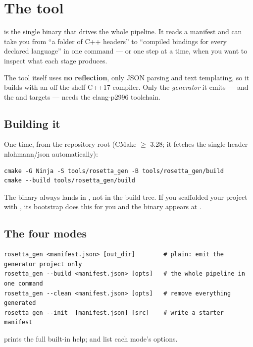 \chapter{The  tool}
\label{ch:rosettagen}

 is the single binary that drives the whole pipeline. It
reads a manifest and can take you from ``a folder of C++ headers'' to ``compiled
bindings for every declared language'' in one command --- or one step at a time,
when you want to inspect what each stage produces.

The tool itself uses \textbf{no reflection}, only JSON parsing and text
templating, so it builds with an off-the-shelf C++17 compiler. Only the
\emph{generator} it emits --- and the  and  targets ---
needs the clang-p2996 toolchain.

\section{Building it}

One-time, from the repository root (CMake $\geq$ 3.28; it fetches the
single-header nlohmann/json automatically):

\begin{lstlisting}[style=sh]
cmake -G Ninja -S tools/rosetta_gen -B tools/rosetta_gen/build
cmake --build tools/rosetta_gen/build
\end{lstlisting}

The binary always lands in \textbf{}, not in the
build tree. If you scaffolded your project with ,
its bootstrap  does this for you and the binary appears at
.

\section{The four modes}

\begin{lstlisting}[style=plain]
rosetta_gen <manifest.json> [out_dir]        # plain: emit the generator project only
rosetta_gen --build <manifest.json> [opts]   # the whole pipeline in one command
rosetta_gen --clean <manifest.json> [opts]   # remove everything generated
rosetta_gen --init  [manifest.json] [src]    # write a starter manifest
\end{lstlisting}

 prints the full built-in help; 
and  list each mode's options.

